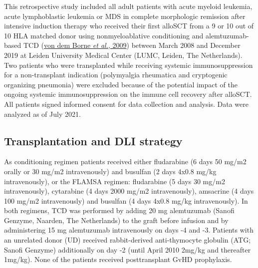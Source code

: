 \documentclass[
  letterpaper,
  DIV=11,
  numbers=noendperiod]{scrreprt}
\begin{document}
This retrospective study included all adult patients with acute myeloid
leukemia, acute lymphoblastic leukemia or MDS in complete morphologic
remission after intensive induction therapy who received their first
alloSCT from a 9 or 10 out of 10 HLA matched donor using
nonmyeloablative conditioning and alemtuzumab-based TCD
(\protect\hyperlink{ref-vondemborneReducedintensityConditioningAllogeneic2009a}{von
dem Borne \emph{et al.}, 2009}) between March 2008 and December 2019 at
Leiden University Medical Center (LUMC, Leiden, The Netherlands). Two
patients who were transplanted while receiving systemic
immunosuppression for a non-transplant indication (polymyalgia
rheumatica and cryptogenic organizing pneumonia) were excluded because
of the potential impact of the ongoing systemic immunosuppression on the
immune cell recovery after alloSCT. All patients signed informed consent
for data collection and analysis. Data were analyzed as of July 2021.

\hypertarget{transplantation-and-dli-strategy}{%
\subsection{Transplantation and DLI
strategy}\label{transplantation-and-dli-strategy}}

As conditioning regimen patients received either fludarabine (6 days 50
mg/m2 orally or 30 mg/m2 intravenously) and busulfan (2 days 4x0.8 mg/kg
intravenously), or the FLAMSA regimen: fludarabine (5 days 30 mg/m2
intravenously), cytarabine (4 days 2000 mg/m2 intravenously), amsacrine
(4 days 100 mg/m2 intravenously) and busulfan (4 days 4x0.8 mg/kg
intravenously). In both regimens, TCD was performed by adding 20 mg
alemtuzumab (Sanofi Genzyme, Naarden, The Netherlands) to the graft
before infusion and by administering 15 mg alemtuzumab intravenously on
days -4 and -3. Patients with an unrelated donor (UD) received
rabbit-derived anti-thymocyte globulin (ATG; Sanofi Genzyme)
additionally on day -2 (until April 2010 2mg/kg and thereafter 1mg/kg).
None of the patients received posttransplant GvHD prophylaxis.
\end{document}

